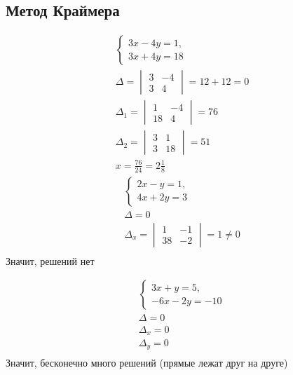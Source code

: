 \documentclass[a4paper, 11pt, oneside]{article}
\begin{document}
\subsection{Метод Краймера}
\begin{gather*}
	\begin{cases}
		3x-4y=1,\\
		3x+4y=18
	\end{cases}\\
	\varDelta =
	\begin{vmatrix}
		3& -4\\
		3& 4
	\end{vmatrix}
	=
	12+12=0\\
	\varDelta_1 =
	\begin{vmatrix}
		1& -4\\
		18& 4
	\end{vmatrix}
	=76\\
	\varDelta_2 =
	\begin{vmatrix}
		3& 1\\
		3& 18
	\end{vmatrix}
	=51\\
	x = \frac{76}{24}=2\frac{1}{8}
\end{gather*}
\begin{gather*}
	\begin{cases}
		2x-y=1,\\
		4x+2y=3
	\end{cases}\\
	\varDelta = 0\\
	\varDelta_x =
	\begin{vmatrix}
		1& -1\\
		38& -2
	\end{vmatrix}
	=1\not= 0\\
\end{gather*}
Значит, решений нет

\begin{gather*}
	\begin{cases}
		3x+y=5,\\
		-6x-2y=-10
	\end{cases}\\
	\varDelta =0\\
	\varDelta_x =0\\
	\varDelta_y =0\\
\end{gather*}
Значит, бесконечно много решений (прямые лежат друг на друге)
\end{document}
